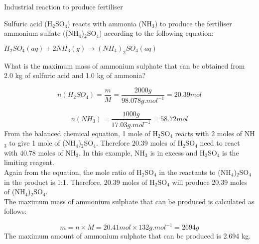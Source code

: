 
\begin{wex}{Industrial reaction to produce fertiliser}{Sulfuric acid (H$_{2}$SO$_{4}$) reacts with ammonia (NH$_{3}$) to produce the fertiliser ammonium sulfate ((NH$_{4}$)$_{2}$SO$_{4}$) according to the following equation:

\begin{center}
\rm${H_{2}SO_{4}(aq) + 2NH_{3}(g) \rightarrow (NH_{4})_{2}SO_{4}(aq)}$
\end{center}

What is the maximum mass of ammonium sulphate that can be obtained from 2.0 kg of sulfuric acid and 1.0 kg of ammonia?
}
{
\begin{equation*}
n(H_{2}SO_{4}) = \frac{m}{M} = \frac{2000 g}{98.078 g.mol^{-1}} = 20.39 mol
\end{equation*}

\begin{equation*}
n(NH_{3}) = \frac{1000 g}{17.03 g.mol^{-1}} = 58.72 mol
\end{equation*}
From the balanced chemical equation, 1 mole of H$_{2}$SO$_{4}$ reacts with 2 moles of NH$_{3}$ to give 1 mole of (NH$_{4}$)$_{2}$SO$_{4}$. Therefore 20.39 moles of H$_{2}$SO$_{4}$ need to react with 40.78 moles of NH$_{3}$. In this example, NH$_{3}$ is in excess and H$_{2}$SO$_{4}$ is the limiting reagent.\\
Again from the equation, the mole ratio of H$_{2}$SO$_{4}$ in the reactants to (NH$_{4}$)$_{2}$SO$_{4}$ in the product is 1:1. Therefore, 20.39 moles of H$_{2}$SO$_{4}$ will produce 20.39 moles of (NH$_{4}$)$_{2}$SO$_{4}$.\\

The maximum mass of ammonium sulphate that can be produced is calculated as follows:

\begin{equation*}
m = n \times M = 20.41 mol \times 132 g.mol^{-1} = 2694 g
\end{equation*}  
The maximum amount of ammonium sulphate that can be produced is 2.694 kg.
}
\end{wex}

